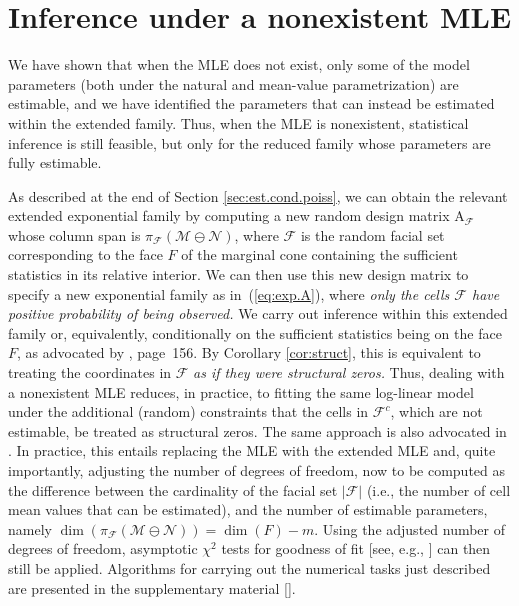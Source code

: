 \documentclass[aos,MSNbibl,nameyear,dvips]{arximspdf}
\newcommand{\m}[1]{\mathrm{#1}}
\newcommand{\eqref}[1]{(\ref{#1})}
\begin{document}
\section{Inference under a nonexistent MLE}\label{sec:inf}

We have shown that when the MLE does not exist, only some of the model
parameters (both under the natural and mean-value parametrization) are
estimable, and we\vadjust{\goodbreak} have identified the parameters that can instead be
estimated within the extended family. Thus, when the MLE is
nonexistent, statistical inference is still feasible, but only for the
reduced family whose parameters are fully estimable.

As described at the end of Section \ref{sec:est.cond.poiss}, we can
obtain the relevant extended exponential family by computing a new
random design matrix $\m{A}_\mathcal{F}$ whose column span is
$\pi_{\mathcal{F}}(\mathcal{M} \ominus\mathcal{N})$, where
$\mathcal{F}$ is the random facial set corresponding to the face $F$ of
the marginal cone containing the sufficient statistics in its relative
interior. We can then use this new design matrix to specify a new
exponential family as in~\eqref{eq:exp.A}, where {\it only the cells
$\mathcal{F}$ have positive probability of being observed.} We carry
out inference within this extended family or, equivalently,
conditionally on the sufficient statistics being on the face~$F$, as
advocated by \citet{BARN78}, page~156. By Corollary \ref{cor:struct},
this is equivalent to treating the coordinates in $\mathcal{F}$ {\it as
if they were structural zeros.} Thus, dealing with a nonexistent MLE
reduces, in practice, to fitting the same log-linear model under the
additional (random) constraints that the cells in $\mathcal{F}^c$,
which are not estimable, be treated as structural zeros. The same
approach is also advocated in \citet{GEYER09}. In practice, this
entails replacing the MLE with the extended MLE and, quite importantly,
adjusting the number of degrees of freedom, now to be computed as the
difference between the cardinality of the facial set $|\mathcal{F}|$
(i.e., the number of cell mean values that can be estimated), and the
number of estimable parameters, namely $\operatorname{dim}  (
\pi_{\mathcal{F}}(\mathcal{M} \ominus\mathcal{N}) ) =
\operatorname{dim}(F) - m$. Using the adjusted number of degrees of
freedom, asymptotic $\chi^2$ tests for goodness of fit [see, e.g.,
\citet{CR88}] can then still be applied.
Algorithms for carrying out the numerical tasks just described are
presented in the supplementary material [\citet{FRsupp}].
\end{document}
